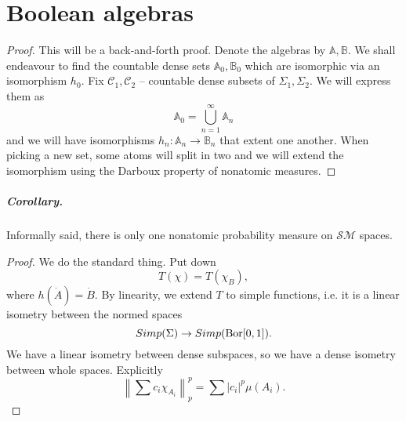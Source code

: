 \chapter{Boolean algebras}


\begin{proof}
    This will be a back-and-forth proof. Denote the algebras by \( \mathbb{A}, \mathbb{B} \). We shall endeavour to find the countable dense sets \( \mathbb{A}_0, \mathbb{B}_0 \) which are isomorphic via an isomorphism \( h_0 \). Fix \( \mathcal{C}_1, \mathcal{C}_2 \) -- countable dense subsets of \( \Sigma_1, \Sigma_2 \). We will express them as 
    \[ 
        \mathbb{A}_0 = \bigcup_{n=1}^\infty \mathbb{A}_n
   \]
   and we will have isomorphisms \( h_n: \mathbb{A}_n \to \mathbb{B}_n \) that extent one another. When picking a new set, some atoms will split in two and we will extend the isomorphism using the Darboux property of nonatomic measures.
\end{proof}

\paragraph{Corollary.} Informally said, there is only one nonatomic probability measure on \( \mathcal{SM} \) spaces. 

\begin{proof}
We do the standard thing. Put down
\[ 
    T( \chi ) = T (\chi_B), 
\]
where \( h(\dot{A}) = \dot{B} \). By linearity, we extend \( T \) to simple functions, i.e. it is a linear isometry between the normed spaces
\[ 
    Simp( \Sigma )  \to Simp( \operatorname{Bor} [0,1] ).
\]
We have a linear isometry between dense subspaces, so we have a dense isometry between whole spaces. Explicitly
\[ 
    \left \| \sum c_i \chi_{A_i} \right\|^p_p = \sum \left| c_i \right|^p \mu(A_i).
\]
\end{proof}

